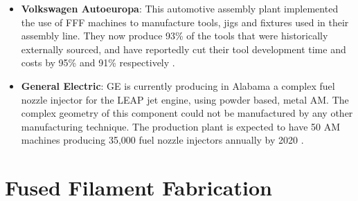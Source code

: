 \documentclass[main.tex]{subfiles}
\begin{document}
\begin{itemize}
	\item \textbf{Volkswagen Autoeuropa}: This automotive assembly plant implemented the use of FFF machines to manufacture tools, jigs and fixtures used in their assembly line. They now produce 93\% of the tools that were historically externally sourced, and have reportedly cut their tool development time and costs by 95\% and 91\% respectively \cite{deVries2017}.
	\item \textbf{General Electric}: GE is currently producing in Alabama a complex fuel nozzle injector for the LEAP jet engine, using powder based, metal AM. The complex geometry of this component could not be manufactured by any other manufacturing technique. The production plant is expected to have 50 AM machines producing 35,000 fuel nozzle injectors annually by 2020 \cite{GEAdditive2016}. 
\end{itemize}
\section{Fused Filament Fabrication}

% 
%
\end{document}
